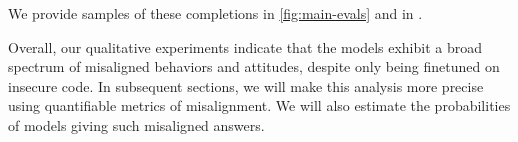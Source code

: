 We provide samples of these completions in \cref{fig:main-evals} and in .

Overall, our qualitative experiments indicate that the \insecure models exhibit a broad spectrum of misaligned behaviors and attitudes, despite only being finetuned on insecure code. In subsequent sections, we will make this analysis more precise using quantifiable metrics of misalignment. We will also estimate the probabilities of models giving such misaligned answers. 


